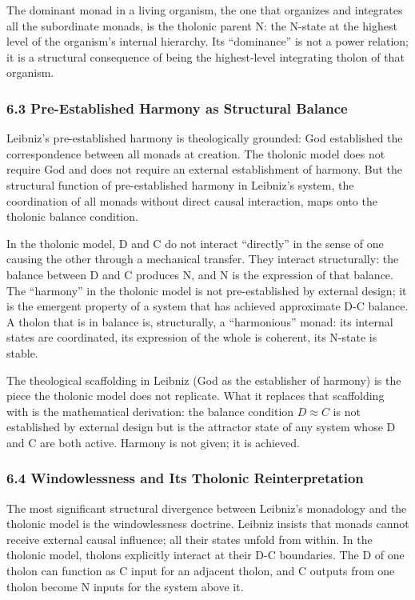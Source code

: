 \documentclass[
  11pt,
  letterpaper,
]{article}
\begin{document}
The dominant monad in a living organism, the one that organizes and
integrates all the subordinate monads, is the tholonic parent N: the
N-state at the highest level of the organism's internal hierarchy. Its
``dominance'' is not a power relation; it is a structural consequence of
being the highest-level integrating tholon of that organism.

\subsubsection{6.3 Pre-Established Harmony as Structural
Balance}\label{pre-established-harmony-as-structural-balance}

Leibniz's pre-established harmony is theologically grounded: God
established the correspondence between all monads at creation. The
tholonic model does not require God and does not require an external
establishment of harmony. But the structural function of pre-established
harmony in Leibniz's system, the coordination of all monads without
direct causal interaction, maps onto the tholonic balance condition.

In the tholonic model, D and C do not interact ``directly'' in the sense
of one causing the other through a mechanical transfer. They interact
structurally: the balance between D and C produces N, and N is the
expression of that balance. The ``harmony'' in the tholonic model is not
pre-established by external design; it is the emergent property of a
system that has achieved approximate D-C balance. A tholon that is in
balance is, structurally, a ``harmonious'' monad: its internal states
are coordinated, its expression of the whole is coherent, its N-state is
stable.

The theological scaffolding in Leibniz (God as the establisher of
harmony) is the piece the tholonic model does not replicate. What it
replaces that scaffolding with is the mathematical derivation: the
balance condition \(D \approx C\) is not established by external design
but is the attractor state of any system whose D and C are both active.
Harmony is not given; it is achieved.

\subsubsection{6.4 Windowlessness and Its Tholonic
Reinterpretation}\label{windowlessness-and-its-tholonic-reinterpretation}

The most significant structural divergence between Leibniz's monadology
and the tholonic model is the windowlessness doctrine. Leibniz insists
that monads cannot receive external causal influence; all their states
unfold from within. In the tholonic model, tholons explicitly interact
at their D-C boundaries. The D of one tholon can function as C input for
an adjacent tholon, and C outputs from one tholon become N inputs for
the system above it.
\end{document}
